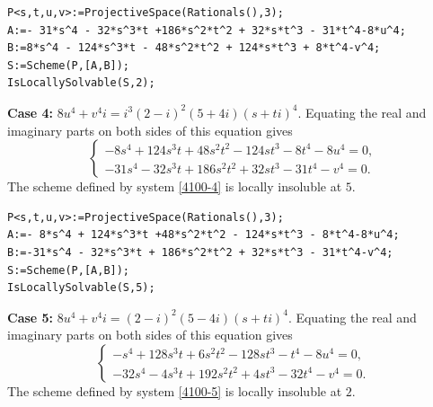 \documentclass[a4paper,12pt,english,reqno]{amsart}
\begin{document}
\begin{lstlisting}
P<s,t,u,v>:=ProjectiveSpace(Rationals(),3);
A:=- 31*s^4 - 32*s^3*t +186*s^2*t^2 + 32*s*t^3 - 31*t^4-8*u^4;
B:=8*s^4 - 124*s^3*t - 48*s^2*t^2 + 124*s*t^3 + 8*t^4-v^4;
S:=Scheme(P,[A,B]);
IsLocallySolvable(S,2);
\end{lstlisting}

{\bf Case 4:} $8u^4+v^4i=i^3(2-i)^2(5+4i)(s+ti)^4$. Equating the real and imaginary parts on both sides of this equation gives
\begin{equation}\label{4100-4}
\begin{cases}
- 8s^4 + 124s^3t +48s^2t^2 - 124st^3 - 8t^4-8u^4=0,\\
-31s^4 - 32s^3t + 186s^2t^2 + 32st^3 - 31t^4-v^4=0.
\end{cases}
\end{equation}
The scheme defined by system \eqref{4100-4} is locally insoluble at $5$.





\begin{lstlisting}
P<s,t,u,v>:=ProjectiveSpace(Rationals(),3);
A:=- 8*s^4 + 124*s^3*t +48*s^2*t^2 - 124*s*t^3 - 8*t^4-8*u^4;
B:=-31*s^4 - 32*s^3*t + 186*s^2*t^2 + 32*s*t^3 - 31*t^4-v^4;
S:=Scheme(P,[A,B]);
IsLocallySolvable(S,5);
\end{lstlisting}

{\bf Case 5:} $8u^4+v^4i=(2-i)^2(5-4i)(s+ti)^4$. Equating the real and imaginary parts on both sides of this equation gives
\begin{equation}\label{4100-5}
\begin{cases}
- s^4 + 128s^3t +6s^2t^2 - 128st^3 - t^4-8u^4=0,\\
-32s^4 - 4s^3t + 192s^2t^2 + 4st^3 - 32t^4-v^4=0.
\end{cases}
\end{equation}
The scheme defined by system \eqref{4100-5} is locally insoluble at $2$.




\end{document}
